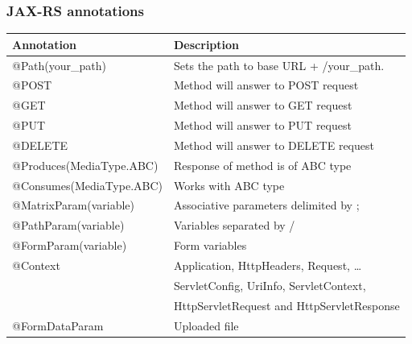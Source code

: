 \documentclass[10pt,xcolor=pdflatex]{beamer}
\begin{document}
\begin{frame}[containsverbatim]\frametitle{JAX-RS annotations}
\begin{footnotesize}
\begin{table}[]
\centering
\bgroup
\def\arraystretch{1.5}%
\begin{tabular}{|l|l|}
\hline
\textbf{Annotation}      & \textbf{Description}                        \\ \hline
@Path(your\_path)        & Sets the path to base URL + /your\_path.    \\ \hline
@POST                    & Method will answer to POST request          \\ \hline
@GET                     & Method will answer to GET request           \\ \hline
@PUT                     & Method will answer to PUT request           \\ \hline
@DELETE                  & Method will answer to DELETE request        \\ \hline
@Produces(MediaType.ABC) & Response of method is of ABC type           \\ \hline
@Consumes(MediaType.ABC) & Works with ABC type                         \\ \hline
@MatrixParam(variable)   & Associative parameters delimited by ;       \\ \hline
@PathParam(variable)     & Variables separated by /                    \\ \hline
@FormParam(variable)     & Form variables                              \\ \hline
@Context                 & Application, HttpHeaders, Request, \ldots   \\
                         & ServletConfig, UriInfo, ServletContext,     \\
                         & HttpServletRequest and HttpServletResponse  \\ \hline
@FormDataParam           & Uploaded file                               \\ \hline
\end{tabular}
\egroup
\end{table}
\end{footnotesize}
\end{frame}
\end{document}
